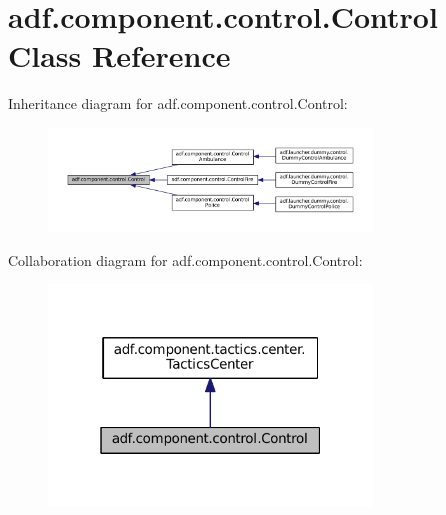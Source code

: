 \hypertarget{classadf_1_1component_1_1control_1_1Control}{}\section{adf.\+component.\+control.\+Control Class Reference}
\label{classadf_1_1component_1_1control_1_1Control}


Inheritance diagram for adf.\+component.\+control.\+Control\+:
\nopagebreak
\begin{figure}[H]
\begin{center}
\leavevmode
\includegraphics[width=244pt]{classadf_1_1component_1_1control_1_1Control__inherit__graph}
\end{center}
\end{figure}


Collaboration diagram for adf.\+component.\+control.\+Control\+:
\nopagebreak
\begin{figure}[H]
\begin{center}
\leavevmode
\includegraphics[width=244pt]{classadf_1_1component_1_1control_1_1Control__coll__graph}
\end{center}
\end{figure}
